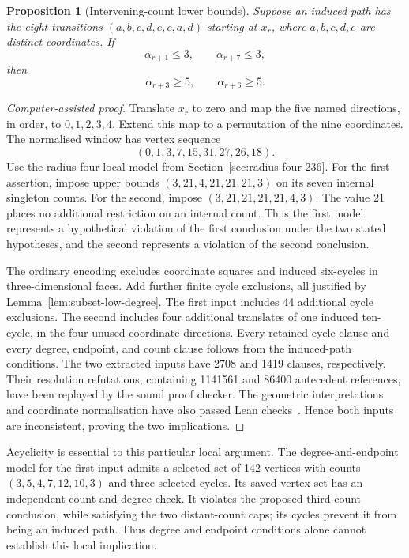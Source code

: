 \documentclass[11pt,a4paper]{article}
\newtheorem{proposition}[theorem]{Proposition}
\theoremstyle{definition}
\theoremstyle{remark}
\begin{document}
\begin{proposition}[Intervening-count lower bounds]\label{prop:intervening-counts}
Suppose an induced path has the eight transitions $(a,b,c,d,e,c,a,d)$ starting at $x_r$, where $a,b,c,d,e$ are distinct coordinates. If
\[
\alpha_{r+1}\le3,\qquad \alpha_{r+7}\le3,
\]
then
\[
\alpha_{r+3}\ge5,\qquad \alpha_{r+6}\ge5.
\]
\end{proposition}
\begin{proof}[Computer-assisted proof]
Translate $x_r$ to zero and map the five named directions, in order, to $0,1,2,3,4$. Extend this map to a permutation of the nine coordinates. The normalised window has vertex sequence
\[
(0,1,3,7,15,31,27,26,18).
\]
Use the radius-four local model from Section~\ref{sec:radius-four-236}. For the first assertion, impose upper bounds $(3,21,4,21,21,21,3)$ on its seven internal singleton counts. For the second, impose $(3,21,21,21,21,4,3)$. The value 21 places no additional restriction on an internal count. Thus the first model represents a hypothetical violation of the first conclusion under the two stated hypotheses, and the second represents a violation of the second conclusion.

The ordinary encoding excludes coordinate squares and induced six-cycles in three-dimensional faces. Add further finite cycle exclusions, all justified by Lemma~\ref{lem:subset-low-degree}. The first input includes 44 additional cycle exclusions. The second includes four additional translates of one induced ten-cycle, in the four unused coordinate directions. Every retained cycle clause and every degree, endpoint, and count clause follows from the induced-path conditions. The two extracted inputs have 2708 and 1419 clauses, respectively. Their resolution refutations, containing 1141561 and 86400 antecedent references, have been replayed by the sound proof checker. The geometric interpretations and coordinate normalisation have also passed Lean checks~\cite{interveningarchive}. Hence both inputs are inconsistent, proving the two implications.
\end{proof}

Acyclicity is essential to this particular local argument. The degree-and-endpoint model for the first input admits a selected set of 142 vertices with counts $(3,5,4,7,12,10,3)$ and three selected cycles. Its saved vertex set has an independent count and degree check. It violates the proposed third-count conclusion, while satisfying the two distant-count caps; its cycles prevent it from being an induced path. Thus degree and endpoint conditions alone cannot establish this local implication.
\end{document}
